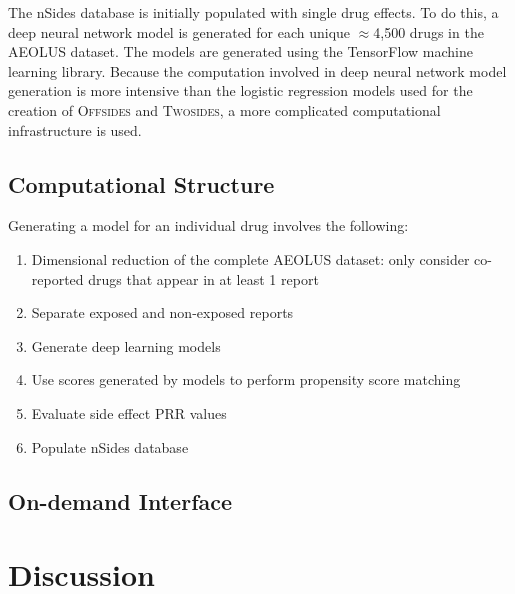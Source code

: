 \documentclass{ws-procs11x85}
\begin{document}
The nSides database is initially populated with single drug
effects. To do this, a deep neural network model is generated for each
unique $\approx$4,500 drugs in the AEOLUS dataset. The models are
generated using the TensorFlow machine learning library. Because the
computation involved in deep neural network model generation is more
intensive than the logistic regression models used for the creation of
O\textsc{ffsides} and T\textsc{wosides}, a more complicated
computational infrastructure is used.

\subsection{Computational Structure}
Generating a model for an individual drug involves the following:
\begin{enumerate}
\item Dimensional reduction of the complete AEOLUS dataset: only consider co-reported drugs that appear in at least 1 report
\item Separate exposed and non-exposed reports
\item Generate deep learning models
\item Use scores generated by models to perform propensity score matching
\item Evaluate side effect PRR values
\item Populate nSides database
\end{enumerate}

\subsection{On-demand Interface}

\section{Discussion}




\end{document}

